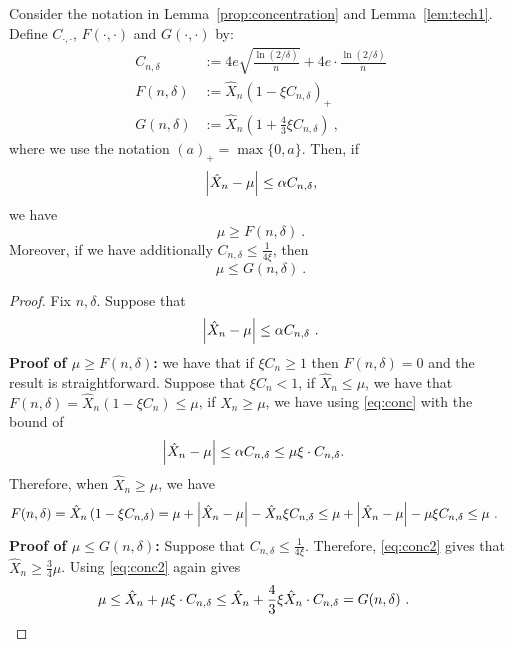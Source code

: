 \begin{lemma}\label{lem:conc2}
	Consider the notation in Lemma~\ref{prop:concentration} and Lemma~\ref{lem:tech1}. Define $C_{\cdot, \cdot}$, $F(\cdot, \cdot)$ and $G(\cdot, \cdot)$ by:
	\begin{align*}
		C_{n,\delta} &:= 4e  \sqrt{\frac{\ln(2/\delta)}{n}}+4e\cdot \frac{\ln(2/\delta)}{n}\\
		F(n, \delta) &:= \hat{X}_n \left(1 - \xi C_{n, \delta}\right)_+\\	
		G(n, \delta) &:=  \hat{X}_n \left(1 + \frac{4}{3}\xi C_{n,\delta}\right)~,
	\end{align*}
	where we use the notation $(a)_+ = \max\{0,a\}$.
	Then, if
	$$
	\left| \hat{X}_n - \mu \right| \le \alpha C_{n,\delta},
	$$
	we have
	$$
	\mu \ge F(n, \delta)~.
	$$
	Moreover, if we have additionally $ C_{n, \delta} \le \frac{1}{4\xi}$, then
	$$
	\mu \le G(n,\delta)~.
	$$
\end{lemma}
%
\begin{proof}
	Fix $n, \delta$. 
	Suppose that
	\begin{equation}\label{eq:conc}
		\left| \hat{X}_n - \mu \right| \le \alpha C_{n, \delta}~.
	\end{equation}
	\textbf{Proof of $\mu \ge F(n, \delta)$:}
	we have that if $\xi C_n \ge 1$ then $F(n, \delta) = 0$ and the result is straightforward. Suppose that $\xi C_n < 1$, if $\hat{X}_n \le \mu$, we have that $F(n, \delta) = \hat{X}_n (1-\xi C_n) \le \mu$, if $\hat{X}_n \ge \mu$, we have using \eqref{eq:conc} with the bound of 
	\begin{align}
		\label{eq:conc2}
		\left| \hat{X}_n - \mu \right| &\le \alpha C_{n, \delta}
		\le	\mu\xi\cdot C_{n, \delta}.
	\end{align}
	Therefore, when $\hat{X}_n \ge \mu$, we have
	\begin{align*}
		F(n, \delta) &= \hat{X}_n \left(1-\xi C_{n, \delta}\right)
		= \mu+ \left| \hat{X}_n - \mu \right| - \hat{X}_n \xi C_{n, \delta}
		\le  \mu+ \left| \hat{X}_n - \mu \right| - \mu \xi C_{n, \delta}
		\le \mu~.
	\end{align*}
	\textbf{Proof of $\mu \le G(n,\delta)$:} Suppose that $C_{n,\delta} \le \frac{1}{4\xi}$. 
	Therefore, \eqref{eq:conc2} gives that $\hat{X}_n \ge \frac{3}{4}\mu$. Using \eqref{eq:conc2} again gives
	\begin{align*}
		\mu &\le \hat{X}_n+ \mu \xi \cdot C_{n,\delta}
		\le \hat{X}_n+  \frac{4}{3}\xi\hat{X}_n\cdot C_{n,\delta}
		= G(n,\delta)~. \qedhere
	\end{align*}
\end{proof}


